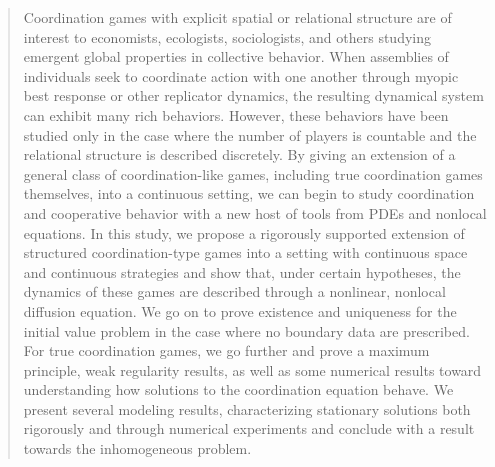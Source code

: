 \documentclass[aps,
preprint,
groupedaddress,
showkeys,
amsmath]{revtex4-2}
\begin{document}
\begin{abstract}
Coordination games with explicit spatial or relational structure are of interest to economists, ecologists, sociologists, and others studying emergent global properties in collective behavior. When assemblies of individuals seek to coordinate action with one another through myopic best response or other replicator dynamics, the resulting dynamical system can exhibit many rich behaviors. However, these behaviors have been studied only in the case where the number of players is countable and the relational structure is described discretely. By giving an extension of a general class of coordination-like games, including true coordination games themselves,  into a continuous setting, we can begin to study coordination and cooperative behavior with a new host of tools from PDEs and nonlocal equations. In this study, we propose a rigorously supported extension of structured coordination-type games into a setting with continuous space and continuous strategies and show that, under certain hypotheses, the dynamics of these games are described through a nonlinear, nonlocal diffusion equation. We go on to prove existence and uniqueness for the initial value problem in the case where no boundary data are prescribed. For true coordination games, we go further and prove a maximum principle, weak regularity results, as well as some numerical results toward understanding how solutions to the coordination equation behave. We present several modeling results, characterizing stationary solutions both rigorously and through numerical experiments and conclude with a result towards the inhomogeneous problem. 
\end{abstract}


\maketitle
\end{document}
